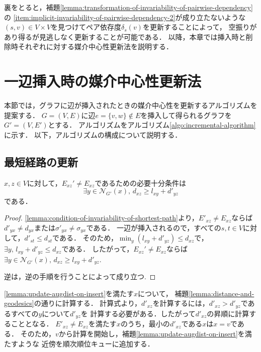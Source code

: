 裏をとると，補題\ref{lemma:transformation-of-invariability-of-pairwise-dependency}の
\ref{item:implicit-invariability-of-pairwise-dependency-2}が成り立たないような
$(s,v)\in V\times V$を見つけてペア依存度$\delta_s(v)$を更新することによって，
空振りがあり得るが見逃しなく更新することが可能である．
以降，本章では挿入時と削除時それぞれに対する媒介中心性更新法を説明する．

\section{一辺挿入時の媒介中心性更新法}
\label{sect:update-bc-on-insert}
本節では，グラフに辺が挿入されたときの媒介中心性を更新するアルゴリズムを提案する．
$G=(V,E)$に辺$e=\{v,w\} \not\in E$を挿入して得られるグラフを$G'=(V,E')$とする．
アルゴリズムをアルゴリズム\ref{algo:incremental-algorithm}に示す．
以下，アルゴリズムの構成について説明する．

\subsection{最短経路の更新}
\label{subsect:update-augdist-on-insert}

\begin{lemma}
  \label{lemma:update-augdist-on-insert}
  $x,z\in V$に対して，$E_{xz}'\neq E_{xz}$であるための必要十分条件は
  \[ \exists y\in\mathcal{N}_{G'}(x),\,d_{xz}\geq l_{xy}+d'_{yz} \]
  である．
\end{lemma}
\begin{proof}
  \ref{lemma:condition-of-invariability-of-shortest-path}より，$E'_{xz}\neq E_{xz}$ならば
  $d'_{yx}\neq d_{yx}$または$\sigma'_{yx}\neq\sigma_{yx}$である．
  一辺が挿入されるので，すべての$s,t\in V$に対して，$d'_{st}\leq d_{st}$である．
  そのため，$\min_y(l_{xy}+d'_{yz})\leq d_{xz}$で，$\exists y,\,l_{xy}+d'_{yz}\leq d_{xz}$である．
  したがって，$E_{xz}'\neq E_{xz}$ならば$\exists y\in\mathcal{N}_{G'}(x),\,d_{xz}\geq l_{xy}+d'_{yz}$.

  逆は，逆の手順を行うことによって成り立つ.
\end{proof}

\ref{lemma:update-augdist-on-insert}を満たす$x$について，
補題\ref{lemma:distance-and-geodesics}の通りに計算する．
計算式より，$d'_{xz}$を計算するには，$d'_{xz}>d'_{yz}$であるすべての$y$について$d'_{yz}$を
計算する必要がある．したがって$d'_{xz}$の昇順に計算することとなる．
$E'_{xz}\neq E_{xz}$を満たす$x$のうち，最小の$d'_{xz}$である$x$は$x=v$である．
そのため，$v$から計算を開始し，補題\ref{lemma:update-augdist-on-insert}を満たすような
近傍を順次順位キューに追加する．

